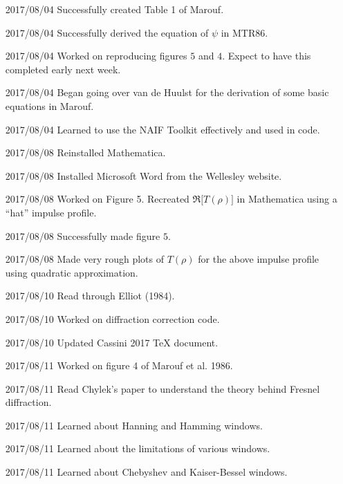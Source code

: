 \documentclass[crop=false,class=article,oneside]{standalone}
\begin{document}
\begin{enumerate}[leftmargin=55pt]
            \item[2017/08/04] Successfully created Table 1 of Marouf. 
            \item[2017/08/04] Successfully derived the equation of $\psi$
                              in MTR86.
            \item[2017/08/04] Worked on reproducing figures $5$ and $4$.
                              Expect to have this completed early next week.
            \item[2017/08/04] Began going over van de Huulst for
                              the derivation
                              of some basic equations in Marouf.
            \item[2017/08/04] Learned to use the NAIF Toolkit effectively
                              and used in code.
            \item[2017/08/08] Reinstalled Mathematica.
            \item[2017/08/08] Installed Microsoft Word from the
                              Wellesley website.
            \item[2017/08/08] Worked on Figure 5. Recreated
                              $\Re\big[T(\rho)\big]$ in Mathematica
                              using a ``hat'' impulse profile.
            \item[2017/08/08] Successfully made figure $5$. 
            \item[2017/08/08] Made very rough plots of $T(\rho)$ for the
                              above impulse profile using quadratic
                              approximation.
            \item[2017/08/10] Read through Elliot (1984).
            \item[2017/08/10] Worked on diffraction correction code.
            \item[2017/08/10] Updated Cassini 2017 TeX document.
            \item[2017/08/11] Worked on figure 4 of Marouf et al. 1986.
            \item[2017/08/11] Read Chylek's paper to understand the theory behind Fresnel diffraction.
            \item[2017/08/11] Learned about Hanning and Hamming windows.
            \item[2017/08/11] Learned about the limitations
                              of various windows.
            \item[2017/08/11] Learned about Chebyshev and
                              Kaiser-Bessel windows.

\end{enumerate}
\end{document}
